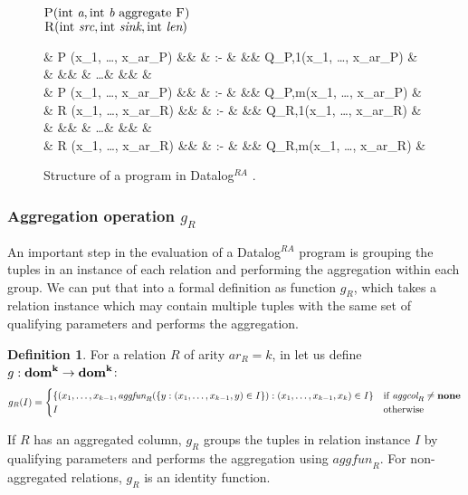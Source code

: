 \documentclass{pracamgr}
\theoremstyle{plain}
\theoremstyle{definition}
\newtheorem{defn}{Definition}[section]
\theoremstyle{remark}
\newcommand{\datalogra}{Datalog$^{RA}$ }
\newcommand{\aggfun}{\textit{aggfun} }
\newcommand{\aggcol}{\textit{aggcol} }
\newcommand{\narrow}[1]{\begin{changemargin}{2cm}{2cm} #1 \end{changemargin}}
\begin{document}
\begin{figure}[h!]
\narrow{
  $\textsc{P}(\text{int } \textit{a}, \text{int } \textit{b} \text{ aggregate } \textsc{F}) $\\
  $\textsc{R}(\text{int } \textit{src}, \text{int } \textit{sink}, \text{int } \textit{len}) $ 
  \begin{flalign*}
  & \textsc{P} (x_1, \dots, x_{ar_P}) &&  & :- & && Q_{P,1}(x_1, \dots, x_{ar_P}) & \\
  &  &&  & \dots & && & \\
  & \textsc{P} (x_1, \dots, x_{ar_P}) &&  & :- & && Q_{P,m}(x_1, \dots, x_{ar_P}) & \\
  & \textsc{R} (x_1, \dots, x_{ar_R}) &&  & :- & && Q_{R,1}(x_1, \dots, x_{ar_R}) & \\
  &  &&  & \dots & && & \\
  & \textsc{R} (x_1, \dots, x_{ar_R}) &&  & :- & && Q_{R,m}(x_1, \dots, x_{ar_R}) & \\
  \end{flalign*}
  \caption{Structure of a program in \datalogra.}
}
\end{figure}

\subsubsection{Aggregation operation $g_R$}
An important step in the evaluation of a \datalogra program is grouping the tuples in an instance of each relation and performing the aggregation within each group. We can put that into a formal definition as function $g_R$, which takes a relation instance which may contain multiple tuples with the same set of qualifying parameters and performs the aggregation.
\begin{defn}\label{d:aggregationoperationgr}
For a relation $R$ of arity $ar_R = k$, in let us define $g: \bf{dom}^k \to \bf{dom}^k$:
$$
g_R(I) = \begin{cases}
\{(x_1, \dots, x_{k-1}, \aggfun_R(\{y: (x_1, \dots, x_{k-1}, y) \in I\}): (x_1, \dots, x_{k-1}, x_k) \in I\} & \text{if } \aggcol_R \ne \bf{none} \\
I & \text{otherwise}
\end{cases}
$$
\end{defn}

If $R$ has an aggregated column, $g_R$ groups the tuples in relation instance $I$ by qualifying parameters and performs the aggregation using $\aggfun_R$. For non-aggregated relations, $g_R$ is an identity function.
\end{document}
